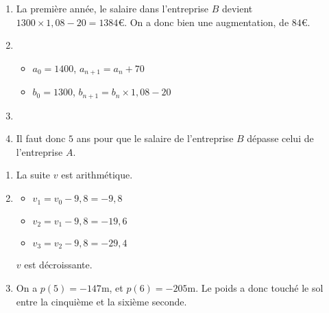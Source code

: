 \documentclass[
	classe=$1^{ere}STI2D$
]{évaluation}
\begin{document}
\begin{exercice}
	\begin{enumerate}
		\item La première année, le salaire dans l'entreprise $B$ devient $1300 × 1,08 - 20 = 1384$€. On a donc bien une augmentation, de $84$€.
		\item \begin{itemize}
			      \item $a_0 = 1400$, $a_{n+1} = a_n + 70$
			      \item $b_0 = 1300$, $b_{n+1} = b_n × 1,08 - 20$
		      \end{itemize}
		\item \begin{center}
		      \end{center}
		\item Il faut donc $5$ ans pour que le salaire de l'entreprise $B$ dépasse celui de l'entreprise $A$.
	\end{enumerate}
\end{exercice}

\begin{exercice}
	\begin{enumerate}
		\item La suite $v$ est arithmétique.
		\item \begin{multicols}{3}
			      \begin{itemize}
				      \item $v_1 = v_0 - 9,8 = -9,8$
				      \item $v_2 = v_1 - 9,8 = -19,6$
				      \item $v_3 = v_2 - 9,8 = -29,4$
			      \end{itemize}
		      \end{multicols}
		      $v$ est décroissante.
		\item On a $p(5) = -147$m, et $p(6) = -205$m. Le poids a donc touché le sol entre la cinquième et la sixième seconde.
	\end{enumerate}
\end{exercice}
\end{document}
